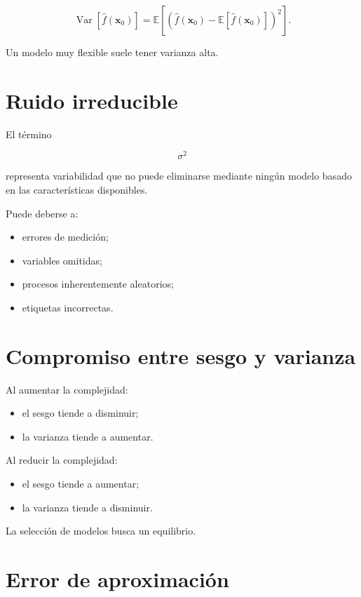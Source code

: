 \documentclass[
  spanish,
  11pt,
  letterpaper,
  DIV=11,
  numbers=noendperiod]{scrreprt}
\providecommand{\tightlist}{%
  \setlength{\itemsep}{0pt}\setlength{\parskip}{0pt}}
\theoremstyle{definition}
\theoremstyle{plain}
\theoremstyle{definition}
\theoremstyle{remark}
\begin{document}
\[
\operatorname{Var}
[
\widehat{f}(\mathbf{x}_0)
]
=
\mathbb{E}
\left[
\left(
\widehat{f}(\mathbf{x}_0)
-
\mathbb{E}
[
\widehat{f}(\mathbf{x}_0)
]
\right)^2
\right].
\]

Un modelo muy flexible suele tener varianza alta.

\section{Ruido irreducible}\label{ruido-irreducible}

El término

\[
\sigma^2
\]

representa variabilidad que no puede eliminarse mediante ningún modelo
basado en las características disponibles.

Puede deberse a:

\begin{itemize}
\tightlist
\item
  errores de medición;
\item
  variables omitidas;
\item
  procesos inherentemente aleatorios;
\item
  etiquetas incorrectas.
\end{itemize}

\section{Compromiso entre sesgo y
varianza}\label{compromiso-entre-sesgo-y-varianza}

Al aumentar la complejidad:

\begin{itemize}
\tightlist
\item
  el sesgo tiende a disminuir;
\item
  la varianza tiende a aumentar.
\end{itemize}

Al reducir la complejidad:

\begin{itemize}
\tightlist
\item
  el sesgo tiende a aumentar;
\item
  la varianza tiende a disminuir.
\end{itemize}

La selección de modelos busca un equilibrio.

\section{Error de aproximación}\label{error-de-aproximaciuxf3n}
\end{document}
